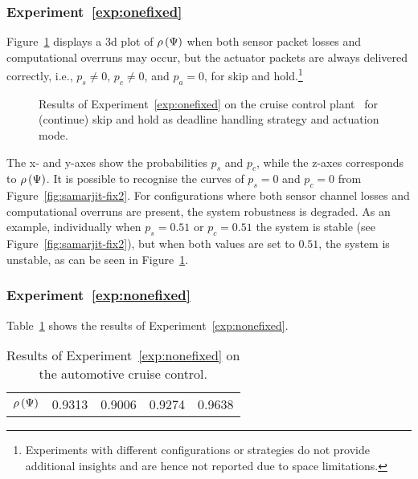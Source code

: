 \subsubsection*{Experiment~\ref{exp:onefixed}}%
Figure~\ref{fig:samarjit-sh-sc} displays a 3d plot of $\rho\left( \Psi \right)$ when both sensor packet losses and computational overruns may occur, but the actuator packets are always delivered correctly, i.e., $p_s \neq 0$, $p_c \neq 0$, and $p_a = 0$, for skip and hold.\footnote{Experiments with different configurations or strategies do not provide additional insights and are hence not reported due to space limitations.}
%
\begin{figure}[t]
    \centering
    \caption{Results of Experiment~\ref{exp:onefixed} on the cruise control plant~\cite{Ghosh:2018} for (continue) skip and hold as deadline handling strategy and actuation mode.}
    \label{fig:samarjit-sh-sc}
\end{figure}
%
The x- and y-axes show the probabilities $p_s$ and $p_c$, while the z-axes corresponds to $\rho\left( \Psi \right)$.
It is possible to recognise the curves of $p_s=0$ and $p_c=0$ from Figure~\ref{fig:samarjit-fix2}.
For configurations where both sensor channel losses and computational overruns are present, the system robustness is degraded.
As an example, individually when $p_s=0.51$ or $p_c=0.51$ the system is stable (see Figure~\ref{fig:samarjit-fix2}), but when both values are set to $0.51$, the system is unstable, as can be seen in Figure~\ref{fig:samarjit-sh-sc}.

\subsubsection*{Experiment~\ref{exp:nonefixed}}%
%
Table~\ref{tab:samarjit} shows the results of Experiment~\ref{exp:nonefixed}.
%
\begin{table}[h]
    \centering
    \def\arraystretch{1.25}
    \caption{Results of Experiment~\ref{exp:nonefixed} on the automotive cruise control.}
    \label{tab:samarjit}
    \begin{tabular}{c|cccc}
                            & \tKZ{} & \tKH{} & \tSZ{} & \tSH{} \\\hline\hline
        $\rho\left( \Psi \right)$  & 0.9313 & 0.9006 & 0.9274 & 0.9638
    \end{tabular}
\end{table}

